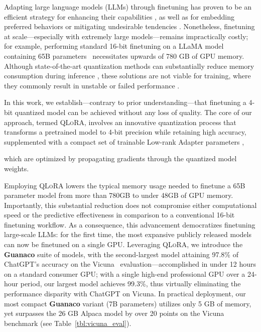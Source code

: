 Adapting large language models (LLMs) through finetuning has proven to be an efficient strategy for enhancing their capabilities \citep{min2021metaicl, wei2021finetuned, ouyang2022training, wang2022super, wang2022self, liu2022few}, as well as for embedding preferred behaviors or mitigating undesirable tendencies \citep{ouyang2022training,askell2021general,bai2022training}. Nonetheless, finetuning at scale—especially with extremely large models—remains impractically costly; for example, performing standard 16-bit finetuning on a LLaMA model containing 65B parameters~\citep{touvron2023llama} necessitates upwards of 780 GB of GPU memory. Although state-of-the-art quantization methods can substantially reduce memory consumption during inference \citep{dettmers2022llm, dettmers2022case, frantar2022gptq, xiao2022smoothquant}, these solutions are not viable for training, where they commonly result in unstable or failed performance \citep{wortsman2023stable}.

In this work, we establish—contrary to prior understanding—that finetuning a 4-bit quantized model can be achieved without any loss of quality. The core of our approach, termed \textsc{QLoRA}, involves an innovative quantization process that transforms a pretrained model to 4-bit precision while retaining high accuracy, supplemented with a compact set of trainable Low-rank Adapter parameters \citep{hu2021lora}, 

which are optimized by propagating gradients through the quantized model weights.

Employing \textsc{QLoRA} lowers the typical memory usage needed to finetune a 65B parameter model from more than 780GB to under 48GB of GPU memory. Importantly, this substantial reduction does not compromise either computational speed or the predictive effectiveness in comparison to a conventional 16-bit finetuning workflow. As a consequence, this advancement democratizes finetuning large-scale LLMs: for the first time, the most expansive publicly released models can now be finetuned on a single GPU. Leveraging \textsc{QLoRA}, we introduce the \textbf{Guanaco} suite of models, with the second-largest model attaining 97.8\% of ChatGPT's accuracy on the Vicuna~\citep{vicuna2023} evaluation—accomplished in under 12 hours on a standard consumer GPU; with a single high-end professional GPU over a 24-hour period, our largest model achieves 99.3\%, thus virtually eliminating the performance disparity with ChatGPT on Vicuna. In practical deployment, our most compact \textbf{Guanaco} variant (7B parameters) utilizes only 5 GB of memory, yet surpasses the 26 GB Alpaca model by over 20 points on the Vicuna benchmark (see Table~\ref{tbl:vicuna_eval}).

